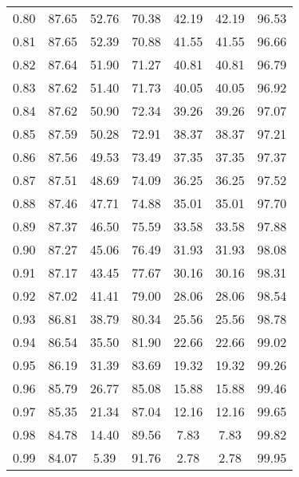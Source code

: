 \begin{tabular}{|c|c|c|c|c|c|c|}
      0.80 &     87.65 &     52.76 &      70.38 &   42.19 &      42.19 &         96.53 \\
      0.81 &     87.65 &     52.39 &      70.88 &   41.55 &      41.55 &         96.66 \\
      0.82 &     87.64 &     51.90 &      71.27 &   40.81 &      40.81 &         96.79 \\
      0.83 &     87.62 &     51.40 &      71.73 &   40.05 &      40.05 &         96.92 \\
      0.84 &     87.62 &     50.90 &      72.34 &   39.26 &      39.26 &         97.07 \\
      0.85 &     87.59 &     50.28 &      72.91 &   38.37 &      38.37 &         97.21 \\
      0.86 &     87.56 &     49.53 &      73.49 &   37.35 &      37.35 &         97.37 \\
      0.87 &     87.51 &     48.69 &      74.09 &   36.25 &      36.25 &         97.52 \\
      0.88 &     87.46 &     47.71 &      74.88 &   35.01 &      35.01 &         97.70 \\
      0.89 &     87.37 &     46.50 &      75.59 &   33.58 &      33.58 &         97.88 \\
      0.90 &     87.27 &     45.06 &      76.49 &   31.93 &      31.93 &         98.08 \\
      0.91 &     87.17 &     43.45 &      77.67 &   30.16 &      30.16 &         98.31 \\
      0.92 &     87.02 &     41.41 &      79.00 &   28.06 &      28.06 &         98.54 \\
      0.93 &     86.81 &     38.79 &      80.34 &   25.56 &      25.56 &         98.78 \\
      0.94 &     86.54 &     35.50 &      81.90 &   22.66 &      22.66 &         99.02 \\
      0.95 &     86.19 &     31.39 &      83.69 &   19.32 &      19.32 &         99.26 \\
      0.96 &     85.79 &     26.77 &      85.08 &   15.88 &      15.88 &         99.46 \\
      0.97 &     85.35 &     21.34 &      87.04 &   12.16 &      12.16 &         99.65 \\
      0.98 &     84.78 &     14.40 &      89.56 &    7.83 &       7.83 &         99.82 \\
      0.99 &     84.07 &      5.39 &      91.76 &    2.78 &       2.78 &         99.95 \\
\bottomrule
\end{tabular}
